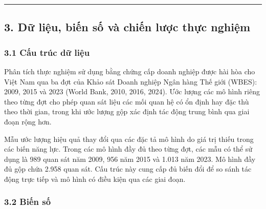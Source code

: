 \documentclass[12pt,a4paper]{article}
\begin{document}
\begin{center}\rule{0.5\linewidth}{0.5pt}\end{center}

\hypertarget{3-dux1eef-liux1ec7u-biux1ebfn-sux1ed1-vuxe0-chiux1ebfn-lux1b0ux1ee3c-thux1ef1c-nghiux1ec7m}{%
\subsection{3. Dữ liệu, biến số và chiến lược thực
nghiệm}\label{3-dux1eef-liux1ec7u-biux1ebfn-sux1ed1-vuxe0-chiux1ebfn-lux1b0ux1ee3c-thux1ef1c-nghiux1ec7m}}

\hypertarget{31-cux1ea5u-truxfac-dux1eef-liux1ec7u}{%
\subsubsection{3.1 Cấu trúc dữ
liệu}\label{31-cux1ea5u-truxfac-dux1eef-liux1ec7u}}

Phân tích thực nghiệm sử dụng bằng chứng cấp doanh nghiệp được hài hòa
cho Việt Nam qua ba đợt của Khảo sát Doanh nghiệp Ngân hàng Thế giới
(WBES): 2009, 2015 và 2023 (World Bank, 2010, 2016, 2024). Ước lượng các
mô hình riêng theo từng đợt cho phép quan sát liệu các mối quan hệ có ổn
định hay đặc thù theo thời gian, trong khi ước lượng gộp xác định tác
động trung bình qua giai đoạn rộng hơn.

Mẫu ước lượng hiệu quả thay đổi qua các đặc tả mô hình do giá trị thiếu
trong các biến năng lực. Trong các mô hình đầy đủ theo từng đợt, các mẫu
có thể sử dụng là 989 quan sát năm 2009, 956 năm 2015 và 1.013 năm 2023.
Mô hình đầy đủ gộp chứa 2.958 quan sát. Cấu trúc này cung cấp đủ biến
đổi để so sánh tác động trực tiếp và mô hình có điều kiện qua các giai
đoạn.

\hypertarget{32-biux1ebfn-sux1ed1}{%
\subsubsection{3.2 Biến số}\label{32-biux1ebfn-sux1ed1}}
\end{document}
